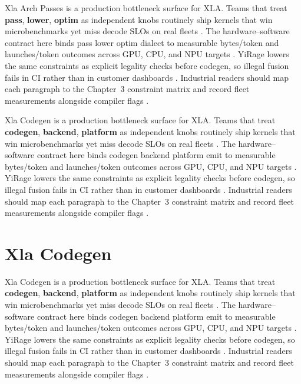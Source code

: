 Xla Arch Passes is a production bottleneck surface for XLA. Teams that treat \textbf{pass}, \textbf{lower}, \textbf{optim} as independent knobs routinely ship kernels that win microbenchmarks yet miss decode SLOs on real fleets \citep{patel2025llminference,nvidia2022hopper}. The hardware--software contract here binds pass lower optim dialect to measurable bytes/token and launches/token outcomes across GPU, CPU, and NPU targets \citep{taxbreak2026,semianalysis2024tma}. YiRage lowers the same constraints as explicit legality checks before codegen, so illegal fusion fails in CI rather than in customer dashboards \citep{memoryfloor2026,amd2024xdna}. Industrial readers should map each paragraph to the Chapter~3 constraint matrix and record fleet measurements alongside compiler flags \citep{nvidia2022hopper,amd2024aie}.

Xla Codegen is a production bottleneck surface for XLA. Teams that treat \textbf{codegen}, \textbf{backend}, \textbf{platform} as independent knobs routinely ship kernels that win microbenchmarks yet miss decode SLOs on real fleets \citep{taxbreak2026,semianalysis2024tma}. The hardware--software contract here binds codegen backend platform emit to measurable bytes/token and launches/token outcomes across GPU, CPU, and NPU targets \citep{memoryfloor2026,amd2024xdna}. YiRage lowers the same constraints as explicit legality checks before codegen, so illegal fusion fails in CI rather than in customer dashboards \citep{nvidia2022hopper,amd2024aie}. Industrial readers should map each paragraph to the Chapter~3 constraint matrix and record fleet measurements alongside compiler flags \citep{semianalysis2024tma,dlbook}.

\section{Xla Codegen}
\label{sec:xla_codegen}

Xla Codegen is a production bottleneck surface for XLA. Teams that treat \textbf{codegen}, \textbf{backend}, \textbf{platform} as independent knobs routinely ship kernels that win microbenchmarks yet miss decode SLOs on real fleets \citep{memoryfloor2026,amd2024xdna}. The hardware--software contract here binds codegen backend platform emit to measurable bytes/token and launches/token outcomes across GPU, CPU, and NPU targets \citep{nvidia2022hopper,amd2024aie}. YiRage lowers the same constraints as explicit legality checks before codegen, so illegal fusion fails in CI rather than in customer dashboards \citep{semianalysis2024tma,dlbook}. Industrial readers should map each paragraph to the Chapter~3 constraint matrix and record fleet measurements alongside compiler flags \citep{amd2024xdna,dao2022flashattention}.

